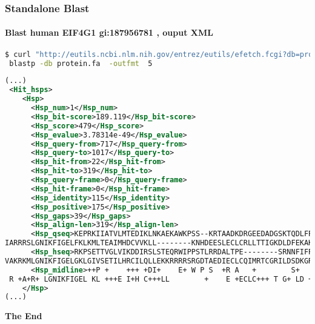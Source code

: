 \documentclass{beamer}
\newcommand{\centeredtitle}[1]{
\begin{center}
    \Huge{\bf{#1}}
\end{center}
}
\newcommand{\hugeslide}[1]{
\begin{frame}
\centeredtitle{#1}
\end{frame}
}
\begin{document}
\begin{frame}[fragile]
\frametitle{Standalone Blast}
\framesubtitle{Blast human EIF4G1 gi:187956781 , ouput XML}
\begin{lstlisting}[language=bash,basicstyle=\tiny,breaklines=true]
$ curl "http://eutils.ncbi.nlm.nih.gov/entrez/eutils/efetch.fcgi?db=protein&rettype=fasta&id=187956781" |\
 blastp -db protein.fa  -outfmt  5
\end{lstlisting}
\begin{lstlisting}[language=xml,basicstyle=\tiny,breaklines=false]
(...)
 <Hit_hsps>
    <Hsp>
      <Hsp_num>1</Hsp_num>
      <Hsp_bit-score>189.119</Hsp_bit-score>
      <Hsp_score>479</Hsp_score>
      <Hsp_evalue>3.78314e-49</Hsp_evalue>
      <Hsp_query-from>717</Hsp_query-from>
      <Hsp_query-to>1017</Hsp_query-to>
      <Hsp_hit-from>22</Hsp_hit-from>
      <Hsp_hit-to>319</Hsp_hit-to>
      <Hsp_query-frame>0</Hsp_query-frame>
      <Hsp_hit-frame>0</Hsp_hit-frame>
      <Hsp_identity>115</Hsp_identity>
      <Hsp_positive>175</Hsp_positive>
      <Hsp_gaps>39</Hsp_gaps>
      <Hsp_align-len>319</Hsp_align-len>
      <Hsp_qseq>KEPRKIIATVLMTEDIKLNKAEKAWKPSS--KRTAADKDRGEEDADGSKTQDLFRRVRSILNKLTPQMFQQLMKQVTQLAIDTEERLKGVIDLIFEKAISEPNFSVAYANMCRCL------MALKVPTTEKPTVTVNFRKLLLNRCQKEFEKDKDDDEVFEKKQKEMDEAATAEERGRLKEELEEARD
IARRRSLGNIKFIGELFKLKMLTEAIMHDCVVKLL--------KNHDEESLECLCRLLTTIGKDLDFEKAKPRMDQYFNQMEKIIKEKKTSSRIRFMLQDVLDLRGSNWVPRRG--DQGPKTIDQIHKEAE</Hsp_qseq>
      <Hsp_hseq>RKPSETTVGLVIKDDIRSLSTEQRWIPPSTLRRDALTPE--------SRNNFIFRKVRGILNKLTPEKFAKLSNDLLNVELNSDVILKGVIFLIFEKALDEPKYSSMYAQLCKRLSDEAANFEPKKALIESQKGQSTFTFLLLSKCRDEFENRSKASEAFENQ----DELGPEEE---------ERRQ
VAKRKMLGNIKFIGELGKLGIVSETILHRCILQLLEKKRRRRSRGDTAEDIECLCQIMRTCGRILDSDKGRGLMDQYFKRMNSLAESRDLPLRIKFMLRDVIELRRDGWVPRKATSTEGPMPINQIRNDNE</Hsp_hseq>
      <Hsp_midline>++P +    +++ +DI+    E+ W P S  +R A   +        S+   +FR+VR ILNKLTP+ F +L   +  + ++++  LKGVI LIFEKA+ EP +S  YA +C+ L         K    E       F  LLL++C+ EFE      E FE +    DE    EE         E
 R +A+R+ LGNIKFIGEL KL +++E I+H C+++LL        +    E +ECLC+++ T G+ LD +K +  MDQYF +M  + + +    RI+FML+DV++LR   WVPR+    +GP  I+QI  + E</Hsp_midline>
    </Hsp>
(...)
\end{lstlisting}
\end{frame}


\hugeslide{The End}
\end{document}
